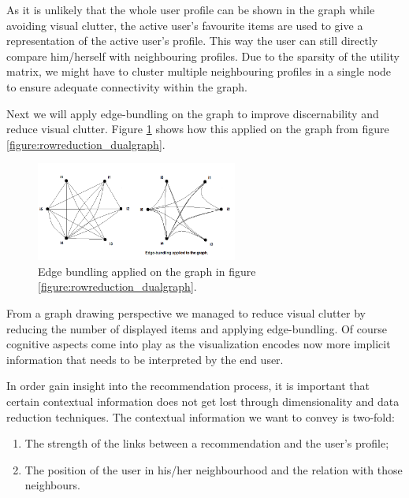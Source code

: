As it is unlikely that the whole user profile can be shown in the graph while avoiding visual clutter, the active user's favourite items are used to give a representation of the active user's profile. This way the user can still directly compare him/herself with neighbouring profiles. Due to the sparsity of the utility matrix, we might have to cluster multiple neighbouring profiles in a single node to ensure adequate connectivity within the graph.

Next we will apply edge-bundling on the graph to improve discernability and reduce visual clutter\cite{Holten:2006:HEB:1187627.1187772, holten:2009}. Figure \ref{figure:edgebundling_dualgraph} shows how this applied on the graph from figure \ref{figure:rowreduction_dualgraph}.

\begin{figure}%
	\begin{center}
		\includegraphics[width=250px]{img/dualgraph_edgebundling}%
	\end{center}
	\caption{Edge bundling applied on the graph in figure \ref{figure:rowreduction_dualgraph}.}%
	\label{figure:edgebundling_dualgraph}%
\end{figure}

From a graph drawing perspective we managed to reduce visual clutter by reducing the number of displayed items and applying edge-bundling\cite{herman:2000, Holten:2006:HEB:1187627.1187772}.  Of course cognitive aspects come into play as the visualization encodes now more implicit information that needs to be interpreted by the end user\cite{herman:2000, ware:2004}.

In order gain insight into the recommendation process, it is important that certain contextual information does not get lost through dimensionality and data reduction techniques. The contextual information we want to convey is two-fold:

\begin{enumerate}
	\item The strength of the links between a recommendation and the user's profile;
	\item The position of the user in his/her neighbourhood and the relation with those neighbours.
\end{enumerate}

